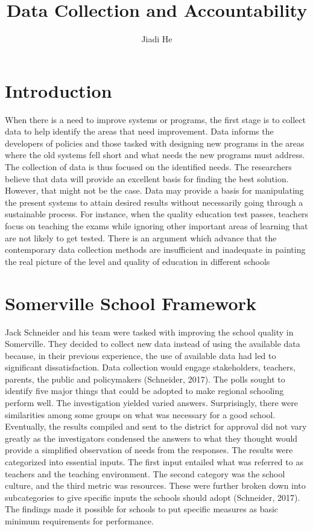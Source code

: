\documentclass[11pt]{article}
\title{Data Collection and Accountability}
\author{Jiadi He}
\begin{document}
\maketitle
\keywordsline

\section{Introduction}

When there is a need to improve systems or programs, the first stage is to collect data to help identify the areas that need improvement. Data informs the developers of policies and those tasked with designing new programs in the areas where the old systems fell short and what needs the new programs must address. The collection of data is thus focused on the identified needs. The researchers believe that data will provide an excellent basis for finding the best solution. However, that might not be the case. Data may provide a basis for manipulating the present systems to attain desired results without necessarily going through a sustainable process. For instance, when the quality education test passes, teachers focus on teaching the exams while ignoring other important areas of learning that are not likely to get tested. There is an argument which advance that the contemporary data collection methods are insufficient and inadequate in painting the real picture of the level and quality of education in different schools

\section{Somerville School Framework}

Jack Schneider and his team were tasked with improving the school quality in Somerville. They decided to collect new data instead of using the available data because, in their previous experience, the use of available data had led to significant dissatisfaction. Data collection would engage stakeholders, teachers, parents, the public and policymakers (Schneider, 2017). The polls sought to identify five major things that could be adopted to make regional schooling perform well. The investigation yielded varied answers. Surprisingly, there were similarities among some groups on what was necessary for a good school. Eventually, the results compiled and sent to the district for approval did not vary greatly as the investigators condensed the answers to what they thought would provide a simplified observation of needs from the responses. The results were categorized into essential inputs. The first input entailed what was referred to as teachers and the teaching environment. The second category was the school culture, and the third metric was resources. These were further broken down into subcategories to give specific inputs the schools should adopt (Schneider, 2017). The findings made it possible for schools to put specific measures as basic minimum requirements for performance.
\end{document}
